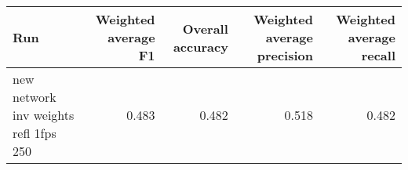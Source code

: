 \begin{tabular}{lrrrr}
\toprule
Run & Weighted average F1 & Overall accuracy & Weighted average precision & Weighted average recall \\
\midrule
new network inv weights refl 1fps 250 & 0.483 & 0.482 & 0.518 & 0.482 \\
\bottomrule
\end{tabular}

